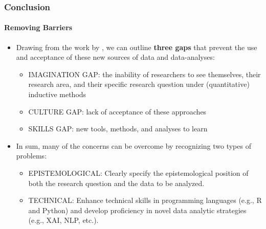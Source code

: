 \documentclass{beamer}
\begin{document}
\begin{frame}
	\frametitle{Conclusion}
	\framesubtitle{Removing Barriers}
	\begin{itemize}
		\item<1> Drawing from the work by \textcite{paxton2017}, we can outline \textbf{three gaps} that prevent the use and acceptance of these new sources of data and data-analyses:		
		\begin{itemize}
			\item<1> IMAGINATION GAP: the inability of researchers to see themselves, their research area, and their specific research question under (quantitative) inductive methods
			\item<1> CULTURE GAP: lack of acceptance of these approaches
			\item<1> SKILLS GAP: new tools, methods, and analyses to learn {\scriptsize \parencite{konig2020advice, landers2019data}}			
		\end{itemize}		
	\item<2> In sum, many of the concerns can be overcome by recognizing two types of problems:
		\begin{itemize}
			\item<2> EPISTEMOLOGICAL: Clearly specify the epistemological position of both the research question and the data to be analyzed.
			\item<2> TECHNICAL: Enhance technical skills in programming languages (e.g., R and Python) and develop proficiency in novel data analytic strategies (e.g., XAI, NLP, etc.).
		\end{itemize}
	\end{itemize}
\end{frame}
\end{document}
